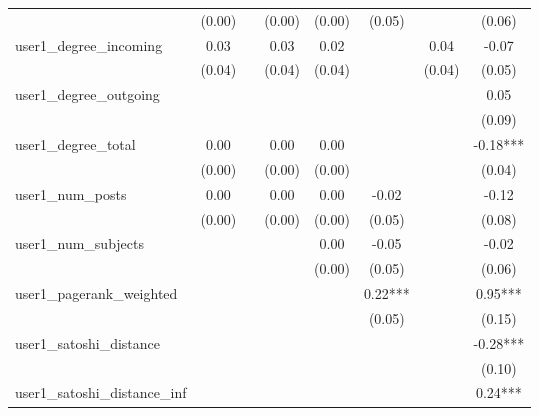\begin{table}
\begin{center}
\begin{tabular}{lccccccc}
                                      & (0.00)   &            & (0.00)  & (0.00)  & (0.05)   &                    & (0.06)        \\
user1_degree_incoming                 & 0.03     &            & 0.03    & 0.02    &          & 0.04               & -0.07         \\
                                      & (0.04)   &            & (0.04)  & (0.04)  &          & (0.04)             & (0.05)        \\
user1_degree_outgoing                 &          &            &         &         &          &                    & 0.05          \\
                                      &          &            &         &         &          &                    & (0.09)        \\
user1_degree_total                    & 0.00     &            & 0.00    & 0.00    &          &                    & -0.18***      \\
                                      & (0.00)   &            & (0.00)  & (0.00)  &          &                    & (0.04)        \\
user1_num_posts                       & 0.00     &            & 0.00    & 0.00    & -0.02    &                    & -0.12         \\
                                      & (0.00)   &            & (0.00)  & (0.00)  & (0.05)   &                    & (0.08)        \\
user1_num_subjects                    &          &            &         & 0.00    & -0.05    &                    & -0.02         \\
                                      &          &            &         & (0.00)  & (0.05)   &                    & (0.06)        \\
user1_pagerank_weighted               &          &            &         &         & 0.22***  &                    & 0.95***       \\
                                      &          &            &         &         & (0.05)   &                    & (0.15)        \\
user1_satoshi_distance                &          &            &         &         &          &                    & -0.28***      \\
                                      &          &            &         &         &          &                    & (0.10)        \\
user1_satoshi_distance_inf            &          &            &         &         &          &                    & 0.24***       \\

\end{tabular}
\end{center}
\end{table}
